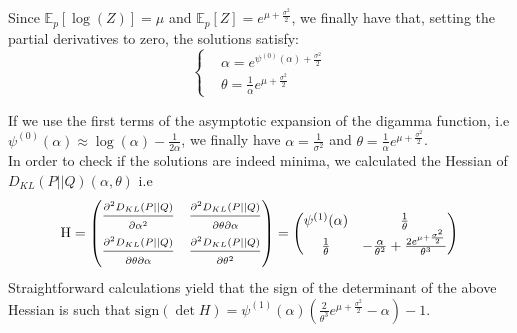 \documentclass{article}
\begin{document}
	Since $\mathbb{E}_p[\log(Z)]=\mu$ and $\mathbb{E}_p[Z] = e^{\mu+\frac{\sigma^2}{2}}$, we finally have that, setting the partial derivatives to zero, the solutions satisfy:
	\[	\begin{cases}
	 & \alpha=e^{\psi^{(0)}(\alpha)+\frac{\sigma^2}{2}} \\
	& \theta=\frac{1}{\alpha}e^{\mu+\frac{\sigma^2}{2}}
	\end{cases}\]

	If we use the first terms of the asymptotic expansion of the digamma function, i.e $\psi^{(0)}(\alpha) \approx \log(\alpha)-\frac{1}{2\alpha}$, we finally have $\alpha =\frac{1}{\sigma^2}$ and $\theta=\frac{1}{\alpha}e^{\mu+\frac{\sigma^2}{2}}$. \\
	
	In order to check if the solutions are indeed minima, we calculated the Hessian of $D_{KL}(P||Q)(\alpha, \theta)$ i.e
	\begin{equation*}
		\text{H} = \begin{pmatrix}
		\frac{\strut \partial^2 D_{KL}(P||Q)}{\strut \partial \alpha^2} & \frac{\strut \partial^2 D_{KL}(P||Q) }{\strut \partial \theta \partial \alpha} \\
		\frac{\strut \partial^2 D_{KL}(P||Q)}{\strut \partial \theta \partial \alpha} & \frac{\strut \partial^2 D_{KL}(P||Q)}{\strut \partial \theta^2} 
		\end{pmatrix} =
		\begin{pmatrix}
		\psi^{(1)}(\alpha) & \frac{1}{\theta} \\
		\frac{1}{\theta} & -\frac{\alpha}{\theta^2}+\frac{2e^{\mu +\frac{\sigma^2}{2}}}{\theta^3}
		\end{pmatrix}
	\end{equation*}
	Straightforward calculations yield that the sign of the determinant of the above Hessian is such that $\text{sign}(\det{H}) = \psi^{(1)}(\alpha)(\frac{2}{\theta^3}e^{\mu +\frac{\sigma^2}{2}} - \alpha) - 1$.
\end{document}
